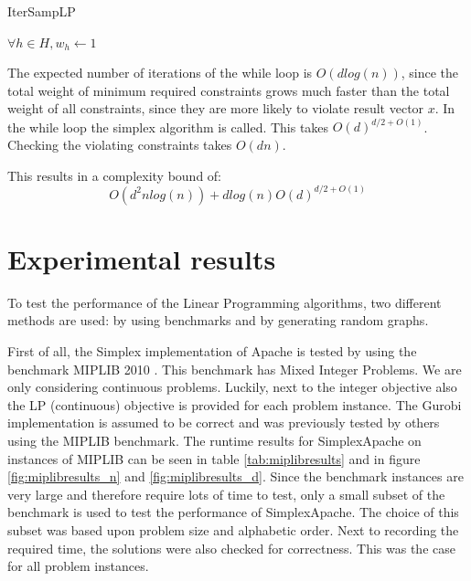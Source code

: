 \documentclass[nocopyrightspace]{acm_proc_article-sp}
\begin{document}
\begin{algorithm}[h]
\label{alg:itersamplp}
\caption{IterSampLP}
$\forall h \in H, w_h \gets 1$ \;
\end{algorithm}

The expected number of iterations of the while loop is $O(d log(n))$, since the total weight of minimum required constraints grows much faster than the total weight of all constraints, since they are more likely to violate result vector $x$. In the while loop the simplex algorithm is called. This takes $O(d)^{d/2+O(1)}$. Checking the violating constraints takes $O(dn)$. 

This results in a complexity bound of:
\begin{equation}
O(d^2n log(n)) + d log(n)O(d)^{d/2+O(1)}
\end{equation}
\vfill
\section{Experimental results}
To test the performance of the Linear Programming algorithms, two different methods are used: by using benchmarks and by generating random graphs.

First of all, the Simplex implementation of Apache is tested by using the benchmark MIPLIB 2010 \cite{KochEtAl2011}. This benchmark has Mixed Integer Problems. We are only considering continuous problems. Luckily, next to the integer objective also the LP (continuous) objective is provided for each problem instance. The Gurobi implementation is assumed to be correct and was previously tested by others using the MIPLIB benchmark. The runtime results for SimplexApache on instances of MIPLIB can be seen in table \ref{tab:miplibresults} and in figure \ref{fig:miplibresults_n} and \ref{fig:miplibresults_d}. Since the benchmark instances are very large and therefore require lots of time to test, only a small subset of the benchmark is used to test the performance of SimplexApache. The choice of this subset was based upon problem size and alphabetic order. Next to recording the required time, the solutions were also checked for correctness. This was the case for all problem instances. 
\end{document}
